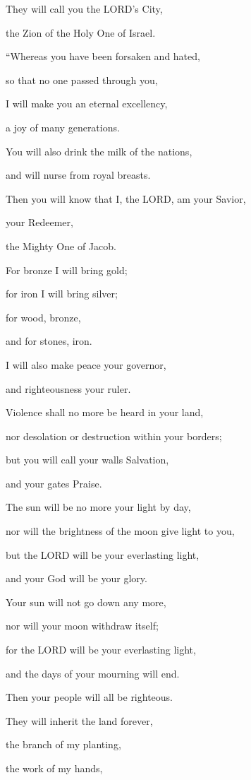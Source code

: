 They will call you the LORD’s City,

the Zion of the Holy One of Israel.


\vspace{\baselineskip} \myverse{}“Whereas you have been forsaken and hated,

so that no one passed through you,

I will make you an eternal excellency,

a joy of many generations.

\myverse{}You will also drink the milk of the nations,

and will nurse from royal breasts.

Then you will know that I, the LORD, am your Savior,

your Redeemer,

the Mighty One of Jacob.

\myverse{}For bronze I will bring gold;

for iron I will bring silver;

for wood, bronze,

and for stones, iron.

I will also make peace your governor,

and righteousness your ruler.

\myverse{}Violence shall no more be heard in your land,

nor desolation or destruction within your borders;

but you will call your walls Salvation,

and your gates Praise.

\myverse{}The sun will be no more your light by day,

nor will the brightness of the moon give light to you,

but the LORD will be your everlasting light,

and your God will be your glory.

\myverse{}Your sun will not go down any more,

nor will your moon withdraw itself;

for the LORD will be your everlasting light,

and the days of your mourning will end.

\myverse{}Then your people will all be righteous.

They will inherit the land forever,

the branch of my planting,

the work of my hands,

